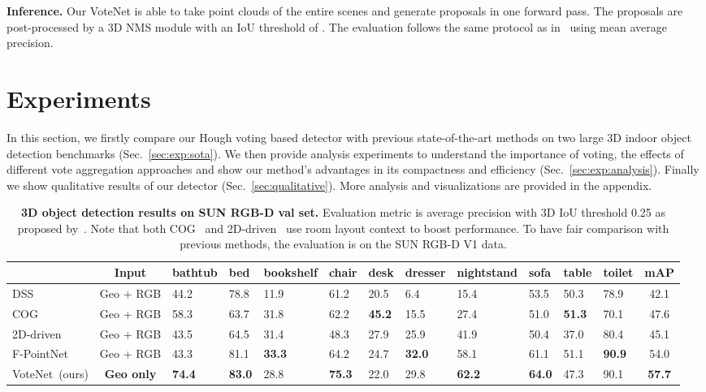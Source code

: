 \documentclass[10pt,twocolumn,letterpaper]{article}
\newcommand\votenet{VoteNet}
\begin{document}
\smallskip\noindent\textbf{Inference.} Our \votenet{} is able to take point clouds of the entire scenes and generate proposals in one forward pass. The proposals are post-processed by a 3D NMS module with an IoU threshold of . The evaluation follows the same protocol as in~\cite{song2016deep} using mean average precision.
 
\section{Experiments}
In this section, we firstly compare our Hough voting based detector with previous state-of-the-art methods on two large 3D indoor object detection benchmarks (Sec.~\ref{sec:exp:sota}). We then provide analysis experiments to understand the importance of voting, the effects of different vote aggregation approaches and show our method's advantages in its compactness and efficiency (Sec.~\ref{sec:exp:analysis}). Finally we show qualitative results of our detector (Sec.~\ref{sec:qualitative}). More analysis and visualizations are provided in the appendix.







\begin{table*}[t!]
\small
\setlength{\tabcolsep}{4.8pt}
\begin{center}
\begin{tabular}{l|c|x{25}x{25}x{25}x{25}x{25}x{25}x{25}x{25}x{25}x{25}|c}
\toprule
          & Input & bathtub & bed & bookshelf & chair & desk & dresser & nightstand & sofa & table & toilet & mAP \\ \midrule
DSS~\cite{song2016deep} & Geo + RGB & 44.2 & 78.8 & 11.9 & 61.2 & 20.5 & 6.4 & 15.4 & 53.5 & 50.3 & 78.9 & 42.1    \\
COG~\cite{ren2016three} & Geo + RGB & 58.3 & 63.7 & 31.8 & 62.2 & \textbf{45.2} & 15.5 & 27.4 & 51.0 & \textbf{51.3} & 70.1 & 47.6 \\
2D-driven~\cite{lahoud20172d} & Geo + RGB & 43.5 & 64.5 & 31.4 & 48.3 & 27.9 & 25.9 & 41.9 & 50.4 & 37.0 & 80.4 & 45.1  \\
F-PointNet~\cite{qi2018frustum} & Geo + RGB & 43.3 & 81.1 & \textbf{33.3} & 64.2 & 24.7 & \textbf{32.0} & 58.1 & 61.1 & 51.1 & \textbf{90.9} & 54.0 \\ \midrule
\votenet~(ours) & \textbf{Geo only} & \textbf{74.4} & \textbf{83.0} & 28.8 & \textbf{75.3} & 22.0 & 29.8 & \textbf{62.2} & \textbf{64.0} & 47.3 & 90.1 & \textbf{57.7} \\
\bottomrule
\end{tabular}
\end{center}
\caption{\textbf{3D object detection results on SUN RGB-D val set.} Evaluation metric is average precision with 3D IoU threshold 0.25 as proposed by~\cite{song2015sun}. Note that both COG~\cite{ren2016three} and 2D-driven~\cite{lahoud20172d} use room layout context to boost performance. To have fair comparison with previous methods, the evaluation is on the SUN RGB-D V1 data.
}
\label{tab:sunrgbd}
\end{table*}
\end{document}
